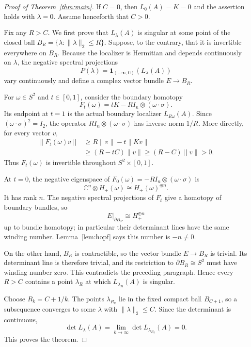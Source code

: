\documentclass[11pt]{article}
\newcommand{\C}{\mathbb{C}}
\newcommand{\1}{I}
\begin{document}
\begin{proof}[Proof of Theorem~\ref{thm:main}]
If $C=0$, then $L_0(A)=K=0$ and the assertion holds with $\lambda=0$.
Assume henceforth that $C>0$.

Fix any $R>C$.  We first prove that $L_\lambda(A)$ is singular at some point
of the closed ball $B_R=\{\lambda:\lVert\lambda\rVert_2\leq R\}$.  Suppose,
to the contrary, that it is invertible everywhere on $B_R$.  Because the
localizer is Hermitian and depends continuously on $\lambda$, the negative
spectral projections
\[
 P(\lambda)=\mathbf 1_{(-\infty,0)}(L_\lambda(A))
\]
vary continuously and define a complex vector bundle $E\to B_R$.

For $\omega\in S^2$ and $t\in[0,1]$, consider the boundary homotopy
\[
 F_t(\omega)=tK-R\1_n\otimes(\omega\cdot\sigma).
\]
Its endpoint at $t=1$ is the actual boundary localizer $L_{R\omega}(A)$.
Since $(\omega\cdot\sigma)^2=\1_2$, the operator
$R\1_n\otimes(\omega\cdot\sigma)$ has inverse norm $1/R$.  More directly,
for every vector $v$,
\begin{align*}
 \lVert F_t(\omega)v\rVert
 &\geq R\lVert v\rVert-t\lVert Kv\rVert\\
 &\geq (R-tC)\lVert v\rVert
 \geq (R-C)\lVert v\rVert>0.
\end{align*}
Thus $F_t(\omega)$ is invertible throughout $S^2\times[0,1]$.

At $t=0$, the negative eigenspace of
$F_0(\omega)=-R\1_n\otimes(\omega\cdot\sigma)$ is
\[
 \C^n\otimes H_+(\omega)\cong H_+(\omega)^{\oplus n}.
\]
It has rank $n$.  The negative spectral projections of $F_t$ give a homotopy
of boundary bundles, so
\[
 E|_{\partial B_R}\cong H_+^{\oplus n}
\]
up to bundle homotopy; in particular their determinant lines have the same
winding number.  Lemma~\ref{lem:hopf} says this number is $-n\neq0$.

On the other hand, $B_R$ is contractible, so the vector bundle $E\to B_R$ is
trivial.  Its determinant line is therefore trivial, and its restriction to
$\partial B_R\cong S^2$ must have winding number zero.  This contradicts the
preceding paragraph.  Hence every $R>C$ contains a point $\lambda_R$ at which
$L_{\lambda_R}(A)$ is singular.

Choose $R_k=C+1/k$.  The points $\lambda_{R_k}$ lie in the fixed compact ball
$B_{C+1}$, so a subsequence converges to some $\lambda$ with
$\lVert\lambda\rVert_2\leq C$.  Since the determinant is continuous,
\[
 \det L_\lambda(A)=
 \lim_{k\to\infty}\det L_{\lambda_{R_k}}(A)=0.
\]
This proves the theorem.
\end{proof}
\end{document}
